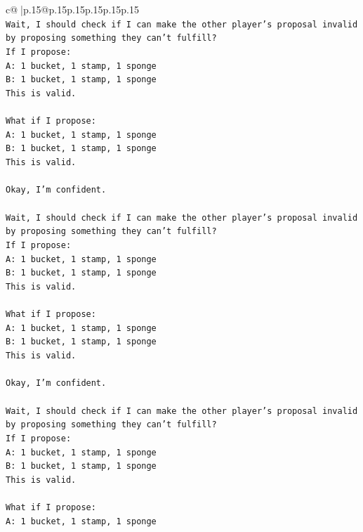 \documentclass{article}
\begin{document}
{\begin{supertabular}{c@{$\;$}|p{.15\linewidth}@{}p{.15\linewidth}p{.15\linewidth}p{.15\linewidth}p{.15\linewidth}p{.15\linewidth}}
{{{\\ 
\texttt{Wait, I should check if I can make the other player's proposal invalid by proposing something they can't fulfill?} \\
\texttt{If I propose:} \\
\texttt{A: 1 bucket, 1 stamp, 1 sponge} \\
\texttt{B: 1 bucket, 1 stamp, 1 sponge} \\
\texttt{This is valid.} \\
\\ 
\texttt{What if I propose:} \\
\texttt{A: 1 bucket, 1 stamp, 1 sponge} \\
\texttt{B: 1 bucket, 1 stamp, 1 sponge} \\
\texttt{This is valid.} \\
\\ 
\texttt{Okay, I'm confident.} \\
\\ 
\texttt{Wait, I should check if I can make the other player's proposal invalid by proposing something they can't fulfill?} \\
\texttt{If I propose:} \\
\texttt{A: 1 bucket, 1 stamp, 1 sponge} \\
\texttt{B: 1 bucket, 1 stamp, 1 sponge} \\
\texttt{This is valid.} \\
\\ 
\texttt{What if I propose:} \\
\texttt{A: 1 bucket, 1 stamp, 1 sponge} \\
\texttt{B: 1 bucket, 1 stamp, 1 sponge} \\
\texttt{This is valid.} \\
\\ 
\texttt{Okay, I'm confident.} \\
\\ 
\texttt{Wait, I should check if I can make the other player's proposal invalid by proposing something they can't fulfill?} \\
\texttt{If I propose:} \\
\texttt{A: 1 bucket, 1 stamp, 1 sponge} \\
\texttt{B: 1 bucket, 1 stamp, 1 sponge} \\
\texttt{This is valid.} \\
\\ 
\texttt{What if I propose:} \\
\texttt{A: 1 bucket, 1 stamp, 1 sponge} \\
}}}
\end{supertabular}}
\end{document}

